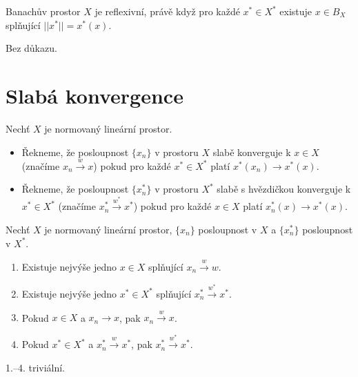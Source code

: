 \documentclass[12pt]{article}					%
\begin{document}
\begin{veta}
	Banachův prostor $X$ je reflexivní, právě když pro každé $x^* \in X^*$ existuje $x \in B_X$ splňující $||x^*|| = x^*(x)$.

	\begin{dukazin}
		Bez důkazu.
	\end{dukazin}
\end{veta}


\section{Slabá konvergence}
\begin{definice}
	Nechť $X$ je normovaný lineární prostor.

	\begin{itemize}
		\item Řekneme, že posloupnost $\{x_n\}$ v prostoru $X$ slabě konverguje k $x \in X$ (značíme $x_n \overset{w}{\rightarrow} x$) pokud pro každé $x^* \in X^*$ platí $x^*(x_n) \rightarrow x^*(x)$.
		\item Řekneme, že posloupnost $\{x_n^*\}$ v prostoru $X^*$ slabě s hvězdičkou konverguje k $x^* \in X^*$ (značíme $x_n^* \overset{w^*}{\rightarrow} x^*$) pokud pro každé $x \in X$ platí $x_n^*(x) \rightarrow x^*(x)$.
	\end{itemize}
\end{definice}

\begin{lemma}
	Nechť $X$ je normovaný lineární prostor, $\{x_n\}$ posloupnost v $X$ a $\{x_n^*\}$ posloupnost v $X^*$.

	\begin{enumerate}
		\item Existuje nejvýše jedno $x \in X$ splňující $x_n \overset{w}{\rightarrow} w$.
		\item Existuje nejvýše jedno $x^* \in X^*$ splňující $x_n^* \overset{w^*}{\rightarrow} x^*$.
		\item Pokud $x \in X$ a $x_n \rightarrow x$, pak $x_n \overset{w}{\rightarrow} x$.
		\item Pokud $x^* \in X^*$ a $x_n^* \overset{w}{\rightarrow} x^*$, pak $x_n^* \overset{w^*}{\rightarrow} x^*$.
	\end{enumerate}

	\begin{dukazin}
		1.–4. triviální.
	\end{dukazin}
\end{lemma}
\end{document}
